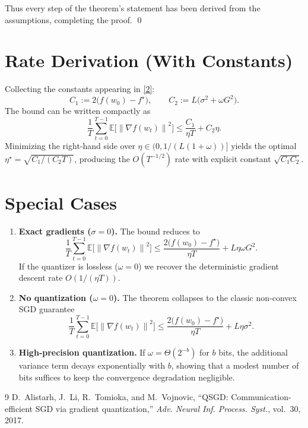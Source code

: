 \documentclass{article}
\newcommand{\E}{\mathbb{E}}
\newcommand{\norm}[1]{\left\lVert #1\right\rVert}
\newcommand{\grad}{\nabla}
\begin{document}
Thus every step of the theorem’s statement has been derived from the assumptions, completing the proof. \qed

\section*{Rate Derivation (With Constants)}
Collecting the constants appearing in \eqref{2}:
\[
C_1:=2\big(f(w_0)-f^{\star}\big),\qquad
C_2:=L\big(\sigma^2+\omega G^2\big).
\]
The bound can be written compactly as
\[
\frac{1}{T}\sum_{t=0}^{T-1}\E\!\big[\norm{\grad f(w_t)}^2\big]
\le \frac{C_1}{\eta T}+C_2\eta .
\]
Minimizing the right‑hand side over $\eta\in(0,1/(L(1+\omega))]$ yields the optimal $\eta^{\star}= \sqrt{C_1/(C_2 T)}$, producing the $O(T^{-1/2})$ rate with explicit constant $\sqrt{C_1 C_2}$.

\section*{Special Cases}
\begin{enumerate}
\item \textbf{Exact gradients ($\sigma=0$).} The bound reduces to
\[
\frac{1}{T}\sum_{t=0}^{T-1}\E\!\big[\norm{\grad f(w_t)}^2\big]
\le \frac{2\big(f(w_0)-f^{\star}\big)}{\eta T}
   +L\eta\omega G^2 .
\]
If the quantizer is lossless ($\omega=0$) we recover the deterministic gradient descent rate $O(1/(\eta T))$.

\item \textbf{No quantization ($\omega=0$).} The theorem collapses to the classic non‑convex SGD guarantee
\[
\frac{1}{T}\sum_{t=0}^{T-1}\E\!\big[\norm{\grad f(w_t)}^2\big]
\le \frac{2\big(f(w_0)-f^{\star}\big)}{\eta T}+L\eta\sigma^2 .
\]

\item \textbf{High‑precision quantization.} If $\omega = \Theta(2^{-b})$ for $b$ bits, the additional variance term decays exponentially with $b$, showing that a modest number of bits suffices to keep the convergence degradation negligible.
\end{enumerate}

\begin{thebibliography}{9}
D.~Alistarh, J.~Li, R.~Tomioka, and M.~Vojnovic, ``QSGD: Communication-efficient SGD via gradient quantization,'' \emph{Adv. Neural Inf. Process. Syst.}, vol.~30, 2017.
\end{thebibliography}
\end{document}
